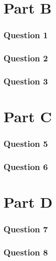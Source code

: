 \documentclass[a4paper,11pt]{article}
\begin{document}
    

	\part*{Part B}
    \section*{Question 1}
    
    \section*{Question 2}
    
    \section*{Question 3}
    \setcounter{subsection}{0}
    
	\part*{Part C}
%    
    \section*{Question 5}
    
    \section*{Question 6}
    \setcounter{subsection}{0}
    
	\part*{Part D}
    \section*{Question 7}
    
    \section*{Question 8}
    \setcounter{subsection}{0}
    
%    
\end{document}
